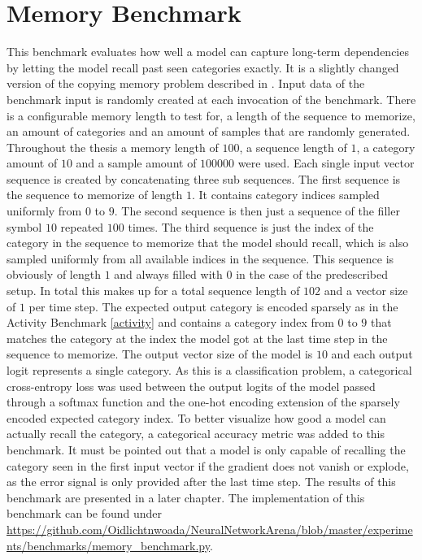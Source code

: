 \documentclass[draft,final]{vutinfth} %
\begin{document}
    \section{Memory Benchmark} \label{memory}
    This benchmark evaluates how well a model can capture long-term dependencies by letting the model recall past seen categories exactly.
    It is a slightly changed version of the copying memory problem described in \cite{UnitaryRNNs}.
    Input data of the benchmark input is randomly created at each invocation of the benchmark.
    There is a configurable memory length to test for, a length of the sequence to memorize, an amount of categories and an amount of samples that are randomly generated.
    Throughout the thesis a memory length of $100$, a sequence length of $1$, a category amount of $10$ and a sample amount of $100000$ were used.
    Each single input vector sequence is created by concatenating three sub sequences.
    The first sequence is the sequence to memorize of length $1$.
    It contains category indices sampled uniformly from $0$ to $9$.
    The second sequence is then just a sequence of the filler symbol $10$ repeated $100$ times.
    The third sequence is just the index of the category in the sequence to memorize that the model should recall, which is also sampled uniformly from all available indices in the sequence.
    This sequence is obviously of length $1$ and always filled with $0$ in the case of the predescribed setup.
    In total this makes up for a total sequence length of $102$ and a vector size of $1$ per time step. 
    The expected output category is encoded sparsely as in the Activity Benchmark \ref{activity} and contains a category index from $0$ to $9$ that matches the category at the index the model got at the last time step in the sequence to memorize.
    The output vector size of the model is $10$ and each output logit represents a  single category.
    As this is a classification problem, a categorical cross-entropy loss was used between the output logits of the model passed through a softmax function and the one-hot encoding extension of the sparsely encoded expected category index.
    To better visualize how good a model can actually recall the category, a categorical accuracy metric was added to this benchmark.
    It must be pointed out that a model is only capable of recalling the category seen in the first input vector if the gradient does not vanish or explode, as the error signal is only provided after the last time step.
    The results of this benchmark are presented in a later chapter.
    The implementation of this benchmark can be found under \url{https://github.com/Oidlichtnwoada/NeuralNetworkArena/blob/master/experiments/benchmarks/memory_benchmark.py}.
\end{document}
